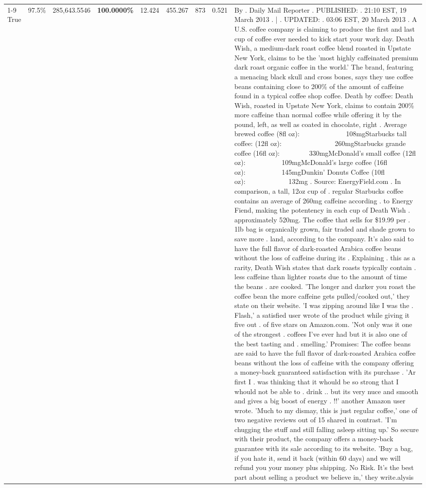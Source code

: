 \begin{table}[H]
{\begin{tabular}{lllrlllll}
\cline{1-9}
True & 97.5\% & 285,643.5546 & \bfseries \color{red} 100.0000\% & 12.424 & 455.267 & 873 & 0.521 & By . Daily Mail Reporter . PUBLISHED: . 21:10 EST, 19 March 2013 . | . UPDATED: . 03:06 EST, 20 March 2013 . A U.S. coffee company is claiming to produce the first and last cup of coffee ever needed to kick start your work day. Death Wish, a medium-dark roast coffee blend roasted in Upstate New York, claims to be the 'most highly caffeinated premium dark roast organic coffee in the world.' The brand, featuring a menacing black skull and cross bones, says they use coffee beans containing close to 200\% of the amount of caffeine found in a typical coffee shop coffee. Death by coffee: Death Wish, roasted in Upstate New York, claims to contain 200\% more caffeine than normal coffee while offering it by the pound, left, as well as coated in chocolate, right . Average brewed coffee (8fl oz):              108mgStarbucks tall coffee: (12fl oz):                260mgStarbucks grande coffee (16fl oz):         330mgMcDonald's small coffee (12fl oz):           109mgMcDonald's large coffee (16fl oz):           145mgDunkin' Donuts Coffee (10fl oz):             132mg . Source: EnergyField.com . In comparison, a tall, 12oz cup of . regular Starbucks coffee contains an average of 260mg caffeine according . to Energy Fiend, making the potentency in each cup of Death Wish . approximately 520mg. The coffee that sells for \$19.99 per . 1lb bag is organically grown, fair traded and shade grown to save more . land, according to the company. It's also said to have the full flavor of dark-roasted Arabica coffee beans without the loss of caffeine during its . Explaining . this as a rarity, Death Wish states that dark roasts typically contain . less caffeine than lighter roasts due to the amount of time the beans . are cooked. 'The longer and darker you roast the coffee bean the more caffeine gets pulled/cooked out,' they state on their website. 'I was zipping around like I was the . Flash,' a satisfied user wrote of the product while giving it five out . of five stars on Amazon.com. 'Not only was it one of the strongest . coffees I've ever had but it is also one of the best tasting and . smelling.’ Promises: The coffee beans are said to have the full flavor of dark-roasted Arabica coffee beans without the loss of caffeine with the company offering a money-back guaranteed satisfaction with its purchase . 'Ar first I . was thinking that it whould be so strong that I whould not be able to . drink .. but its very nuce and smooth and gives a big boost of energy . !!' another Amazon user wrote. 'Much to my dismay, this is just regular coffee,' one of two negative reviews out of 15 shared in contrast. 'I'm chugging the stuff and still falling asleep sitting up.' So secure with their product, the company offers a money-back guarantee with its sale according to its website. 'Buy a bag, if you hate it, send it back (within 60 days) and we will refund you your money plus shipping. No Risk. It’s the best part about selling a product we believe in,' they write.alysis \\

\end{tabular}}
\end{table}
